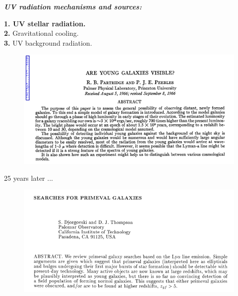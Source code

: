 \documentclass{beamer}
\begin{document}
\begin{frame}{\textit{\textbf{UV radiation mechanisms and sources:}}}

\textbf{1. UV stellar radiation.} \\ 
\textbf{2.} Gravitational cooling. \\
\textbf{3.} UV background radiation.


\end{frame}

\begin{frame}%
\begin{figure}
\includegraphics[scale=0.4]{Figures/PP.png}
\end{figure}
\end{frame}


\begin{frame}
\LARGE{25 years later ...}
\end{frame}

\begin{frame}
\begin{figure}
\includegraphics[scale=0.4]{Figures/DJT.png}
\end{figure}
\end{frame}
\end{document}
